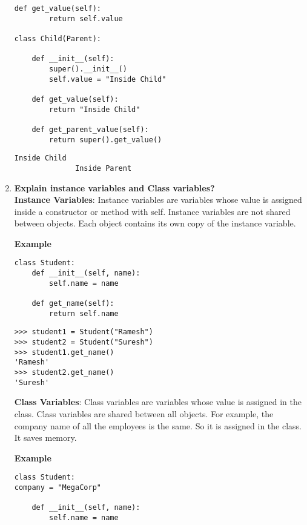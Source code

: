 \documentclass[11pt]{article}
\begin{document}
\begin{enumerate}
\begin{Verbatim}[commandchars=\\\{\}]
	def get_value(self):
		return self.value

class Child(Parent):

	def __init__(self):
		super().__init__()
		self.value = "Inside Child"

	def get_value(self):
		return "Inside Child"

	def get_parent_value(self):
		return super().get_value()
	      \end{Verbatim}

	      \begin{Verbatim}[commandchars=\\\{\}]
		      Inside Child
		      Inside Parent
	      \end{Verbatim}
	\item \textbf{Explain instance variables and Class variables?}\\

	      \textbf{Instance Variables}: Instance variables are variables whose value is assigned inside a constructor or method with self. Instance variables are not shared between objects. Each object contains its own copy of the instance variable.

	      \textbf{Example}

	      \begin{Verbatim}[commandchars=\\\{\}]
class Student:
	def __init__(self, name):
		self.name = name

	def get_name(self):
		return self.name
	      \end{Verbatim}

	      \begin{Verbatim}[commandchars=\\\{\}]
>>> student1 = Student("Ramesh")
>>> student2 = Student("Suresh")
>>> student1.get_name()
'Ramesh'
>>> student2.get_name()
'Suresh'
	      \end{Verbatim}

	      \textbf{Class Variables}: Class variables are variables whose value is assigned in the class. Class variables are shared between all objects. For example, the company name of all the employees is the same. So it is assigned in the class. It saves memory.

	      \textbf{Example}

	      \begin{Verbatim}[commandchars=\\\{\}]
class Student:
company = "MegaCorp"

	def __init__(self, name):
		self.name = name


\end{Verbatim}
\end{enumerate}
\end{document}
